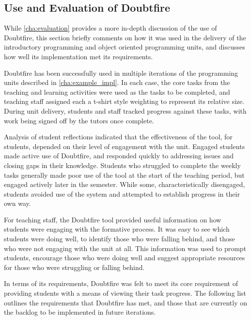 
\subsection{Use and Evaluation of Doubtfire} %
\label{sub:use_of_doubtfire}

While \cref{cha:evaluation} provides a more in-depth discussion of the use of Doubtfire, this section briefly comments on how it was used in the delivery of the introductory programming and object oriented programming units, and discusses how well its implementation met its requirements. 

Doubtfire has been successfully used in multiple iterations of the programming units described in \cref{cha:example_impl}. In each case, the core tasks from the teaching and learning activities were used as the tasks to be completed, and teaching staff assigned each a t-shirt style weighting to represent its relative size. During unit delivery, students and staff tracked progress against these tasks, with work being signed off by the tutors once complete.

Analysis of student reflections indicated that the effectiveness of the tool, for students, depended on their level of engagement with the unit. Engaged students made active use of Doubtfire, and responded quickly to addressing issues and closing gaps in their knowledge. Students who struggled to complete the weekly tasks generally made poor use of the tool at the start of the teaching period, but engaged actively later in the semester. While some, characteristically disengaged, students avoided use of the system and attempted to establish progress in their own way.

For teaching staff, the Doubtfire tool provided useful information on how students were engaging with the formative process. It was easy to see which students were doing well, to identify those who were falling behind, and those who were not engaging with the unit at all. This information was used to prompt students, encourage those who were doing well and suggest appropriate resources for those who were struggling or falling behind.

In terms of its requirements, Doubtfire was felt to meet its core requirement of providing students with a means of viewing their task progress. The following list outlines the requirements that Doubtfire has met, and those that are currently on the backlog to be implemented in future iterations.

